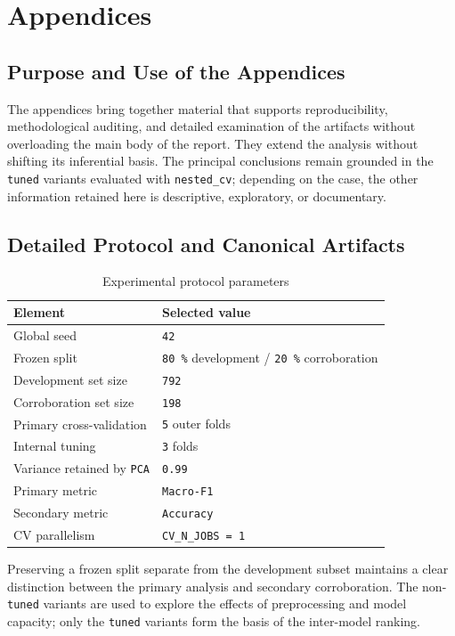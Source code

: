 \section{Appendices}

\subsection{Purpose and Use of the Appendices}
The appendices bring together material that supports reproducibility, methodological auditing, and detailed examination of the artifacts without overloading the main body of the report. They extend the analysis without shifting its inferential basis. The principal conclusions remain grounded in the \texttt{tuned} variants evaluated with \texttt{nested\_cv}; depending on the case, the other information retained here is descriptive, exploratory, or documentary.

\subsection{Detailed Protocol and Canonical Artifacts}

\begin{table}[H]
\centering
\begin{tabular}{|l|l|}
\hline
\textbf{Element} & \textbf{Selected value} \\
\hline
Global seed & \texttt{42} \\
Frozen split & \texttt{80 \%} development / \texttt{20 \%} corroboration \\
Development set size & \texttt{792} \\
Corroboration set size & \texttt{198} \\
Primary cross-validation & \texttt{5} outer folds \\
Internal tuning & \texttt{3} folds \\
Variance retained by \texttt{PCA} & \texttt{0.99} \\
Primary metric & \texttt{Macro-F1} \\
Secondary metric & \texttt{Accuracy} \\
CV parallelism & \texttt{CV\_N\_JOBS = 1} \\
\hline
\end{tabular}
\caption{Experimental protocol parameters}
\end{table}

Preserving a frozen split separate from the development subset maintains a clear distinction between the primary analysis and secondary corroboration. The non-\texttt{tuned} variants are used to explore the effects of preprocessing and model capacity; only the \texttt{tuned} variants form the basis of the inter-model ranking.

